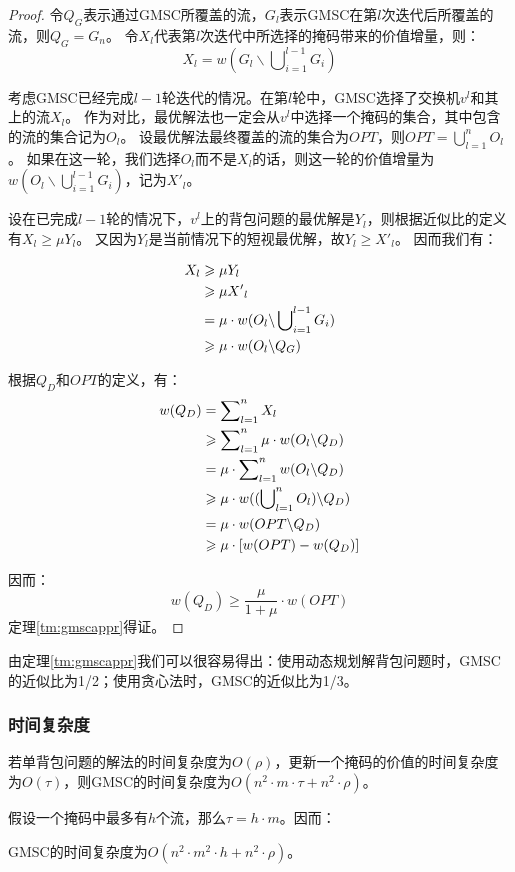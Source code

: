 \begin{proof}
令$Q_G$表示通过GMSC所覆盖的流，$G_l$表示GMSC在第$l$次迭代后所覆盖的流，则$Q_G = G_n$。
令$X_l$代表第$l$次迭代中所选择的掩码带来的价值增量，则：
\begin{equation}
X_l =w(G_l \backslash \bigcup\nolimits^{l-1}_{i=1}G_i)
\end{equation}

考虑GMSC已经完成$l-1$轮迭代的情况。在第$l$轮中，GMSC选择了交换机$v^l$和其上的流$X_l$。
作为对比，最优解法也一定会从$v^l$中选择一个掩码的集合，其中包含的流的集合记为$O_l$。
设最优解法最终覆盖的流的集合为$OPT$，则$OPT = \bigcup\nolimits_{l=1}^{n}O_l$。
如果在这一轮，我们选择$O_l$而不是$X_l$的话，则这一轮的价值增量为$w(O_l \backslash \bigcup\nolimits^{l-1}_{i=1}G_i)$，记为${X'}_l$。

设在已完成$l-1$轮的情况下，$v^l$上的背包问题的最优解是$Y_l$，则根据近似比的定义有$X_l \ge \mu Y_l$。
又因为$Y_l$是当前情况下的短视最优解，故$Y_l \ge {X'}_l$。
因而我们有：

\begin{align}
    X_l &\ge \mu Y_l \notag\\
        &\ge \mu {X'}_l \notag\\
        &= \mu \cdot w(O_l \backslash \bigcup\nolimits^{l-1}_{i=1}G_i) \notag\\
        &\ge \mu \cdot w(O_l \backslash Q_G) \notag
\end{align}

根据$Q_D$和$OPT$的定义，有：
\begin{align}
    w(Q_D)&=\sum\nolimits_{l=1}^{n} X_l \notag\\
        &\ge \sum\nolimits_{l=1}^{n} \mu \cdot w(O_l \backslash Q_D) \notag\\
        &=  \mu \cdot \sum\nolimits_{l=1}^{n} w(O_l \backslash Q_D) \notag\\
        &\ge \mu \cdot w ((\bigcup\nolimits_{l=1}^{n}O_l) \backslash Q_D) \notag\\
        &=  \mu \cdot w( OPT \backslash Q_D) \notag\\
        &\ge \mu \cdot [ w(OPT)-w(Q_D)] \notag
\end{align}

因而：
\begin{equation}\label{eq:gmscappr}
    w(Q_D) \ge \frac{\mu }{1+\mu} \cdot w(OPT)
\end{equation}
定理\ref{tm:gmscappr}得证。
\end{proof}

由定理\ref{tm:gmscappr}我们可以很容易得出：使用动态规划解背包问题时，GMSC的近似比为1/2；使用贪心法时，GMSC的近似比为1/3。

\subsubsection{时间复杂度}
若单背包问题的解法的时间复杂度为$O(\rho)$，更新一个掩码的价值的时间复杂度为$O(\tau)$，则GMSC的时间复杂度为$O(n^2\cdot m \cdot \tau + n^2 \cdot \rho)$。

假设一个掩码中最多有$h$个流，那么$\tau = h\cdot m$。因而：

\begin{theorem}\label{tm:gmsctime}
    GMSC的时间复杂度为$O(n^2\cdot m^2 \cdot h+ n^2 \cdot \rho)$。
\end{theorem}